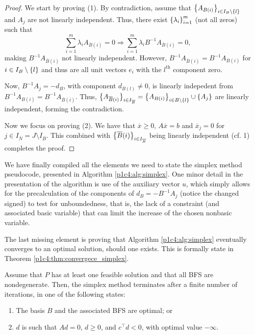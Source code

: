 \begin{proof}
	 We start by proving (1). By contradiction, assume that $\left\{ A_{B(i)} \right \}_{i \in I_B \setminus \left\{ l \right \}}$ and $A_j$ are not linearly independent. Thus, there exist $\left\{ \lambda_i \right \}_{i=1}^m$ (not all zeros) such that
	\begin{equation*}
			\sum_{i=1}^m \lambda_i A_{\overline{B}(i)} = 0 \Rightarrow \sum_{i=1}^m \lambda_i B^{-1}A_{\overline{B}(i)} = 0,
	\end{equation*}
	making $B^{-1}A_{\overline{B}(i)}$ not linearly independent. However, $B^{-1}A_{\overline{B}(i)} = B^{-1}A_{B(i)}$ for $i \in I_B \setminus \left\{ l \right \}$ and thus are all unit vectors $e_i$ with the $l^{\text{th}}$ component zero. 

	Now, $B^{-1}A_j = -d_B$, with component $d_{B(l)} \neq 0$, is linearly indepedent from $B^{-1}A_{B(i)} = B^{-1}A_{\overline{B}(i)}$. Thus, $\big\{A_{\overline{B}(i)}\big\}_{i \in I_{\overline{B}}} = \left\{ A_{B(i)} \right \}_{i \in B \setminus \left\{ l \right \}} \cup \left\{ A_j \right \}$ are linearly independent, forming the contradiction.
	
	Now we focus on proving (2). We have that $\overline{x} \geq 0$, $A\overline{x} = b$ and $\overline{x}_j = 0$ for $j \in I_{\overline{N}} = J \setminus I_{\overline{B}}$. This combined with $\left\{ \overline{B}(i) \right \}_{i \in I_{\overline{B}}}$ being linearly independent (cf. 1) completes the proof.	
\end{proof}

We have finally compiled all the elements we need to state the simplex method pseudocode, presented in Algorithm \ref{p1c4:alg:simplex}. One minor detail in the presentation of the algorithm is use of the auxiliary vector $u$, which simply allows for the precalculation of the components of $d_B = -B^{-1}A_j$ (notice the changed signed) to test for unboundedness, that is, the lack of a constraint (and associated basic variable) that can limit the increase of the chosen nonbasic variable. 

The last missing element is proving that Algorithm \ref{p1c4:alg:simplex} eventually converges to an optimal solution, should one exists. This is formally state in Theorem \ref{p1c4:thm:convergece_simplex}.

\begin{theorem}\label{p1c4:thm:convergece_simplex}
	Assume that $P$ has at least one feasible solution and that all BFS are nondegenerate. Then, the simplex method terminates after a finite number of iterations, in one of the following states:
	\begin{enumerate}
		\item The basis $B$ and the associated BFS are optimal; or
		\item $d$ is such that $Ad = 0$, $d \geq 0$, and $c^\top d < 0$, with optimal value $-\infty$.	
	\end{enumerate}
\end{theorem}

